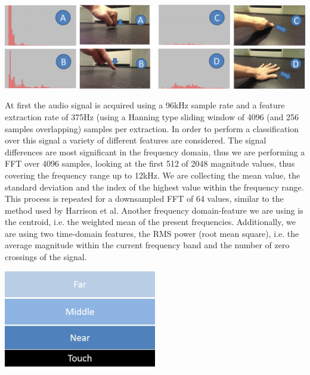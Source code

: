 \begin{minipage}{\linewidth}
\centering
\includegraphics[width=1.0\textwidth]{images/alltouch}
\label{fig:alltouch}
\end{minipage}

At first the audio signal is acquired using a 96kHz sample rate and a feature extraction rate of 375Hz (using a  Hanning type sliding window of 4096 (and 256 samples overlapping) samples per extraction. In order to perform a classification over this signal a variety of different features are considered. The signal differences are most significant in the frequency domain, thus we are performing a FFT over 4096 samples, looking at the first 512 of 2048 magnitude values, thus covering the frequency range up to 12kHz. We are collecting the mean value, the standard deviation and the index of the highest value within the frequency range. This process is repeated for a downsampled FFT of 64 values, similar to the method used by Harrison et al. Another frequency domain-feature we are using is the centroid, i.e. the weighted mean of the present frequencies. Additionally, we are using two time-domain features, the RMS power (root mean square), i.e. the average magnitude within the current frequency band and the number of zero crossings of the signal.

\begin{minipage}{\linewidth}
\centering
\includegraphics[width=0.5\textwidth]{images/captap_layer_interaction}
\label{fig:captap_layer_interaction}
\end{minipage}

